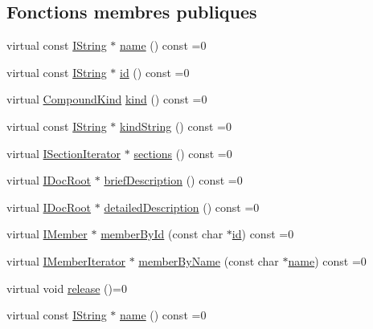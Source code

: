 \subsection*{Fonctions membres publiques}
\begin{DoxyCompactItemize}
\item 
virtual const \hyperlink{class_i_string}{I\+String} $\ast$ \hyperlink{class_i_compound_aaba330144c2c9d424505765f2ff94195}{name} () const  =0
\item 
virtual const \hyperlink{class_i_string}{I\+String} $\ast$ \hyperlink{class_i_compound_adcf419960af1fe868da64bc7481714fb}{id} () const  =0
\item 
virtual \hyperlink{class_i_compound_a6b86be2ca9f6759434c1dd8405be328a}{Compound\+Kind} \hyperlink{class_i_compound_a0fa87b43812418e64a0a82d64a6cc57f}{kind} () const  =0
\item 
virtual const \hyperlink{class_i_string}{I\+String} $\ast$ \hyperlink{class_i_compound_a60e893801397020e7bee2b6ddffcff59}{kind\+String} () const  =0
\item 
virtual \hyperlink{class_i_section_iterator}{I\+Section\+Iterator} $\ast$ \hyperlink{class_i_compound_aa94295e3ba675c026da25565a5e619da}{sections} () const  =0
\item 
virtual \hyperlink{class_i_doc_root}{I\+Doc\+Root} $\ast$ \hyperlink{class_i_compound_aff3daafa3d304da9730fd9b58d8160b1}{brief\+Description} () const  =0
\item 
virtual \hyperlink{class_i_doc_root}{I\+Doc\+Root} $\ast$ \hyperlink{class_i_compound_a276eb18a53d20f9d2211a66df8eb7703}{detailed\+Description} () const  =0
\item 
virtual \hyperlink{class_i_member}{I\+Member} $\ast$ \hyperlink{class_i_compound_a6d697b389c2638b1e092acc117cda382}{member\+By\+Id} (const char $\ast$\hyperlink{class_i_compound_adcf419960af1fe868da64bc7481714fb}{id}) const  =0
\item 
virtual \hyperlink{class_i_member_iterator}{I\+Member\+Iterator} $\ast$ \hyperlink{class_i_compound_abd4cc0d9bd8aa607abe439a82e3c5d7a}{member\+By\+Name} (const char $\ast$\hyperlink{class_i_compound_aaba330144c2c9d424505765f2ff94195}{name}) const  =0
\item 
virtual void \hyperlink{class_i_compound_a5388c74d390323ce610f752a01456b21}{release} ()=0
\item 
virtual const \hyperlink{class_i_string}{I\+String} $\ast$ \hyperlink{class_i_compound_aaba330144c2c9d424505765f2ff94195}{name} () const  =0
\item 

\end{DoxyCompactItemize}
